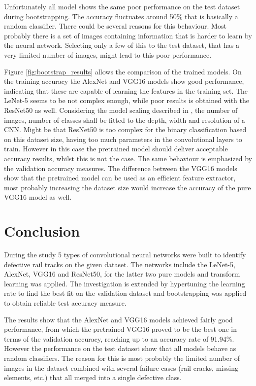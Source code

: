 \documentclass[10pt, final]{article}
\begin{document}
Unfortunately all model shows the same poor performance on the test dataset during bootstrapping.
The accuracy fluctuates around 50\% that is basically a random classifier.
There could be several reasons for this behaviour.
Most probably there is a set of images containing information that is harder to learn by the neural network.
Selecting only a few of this to the test dataset, that has a very limited number of images, might lead to this
poor performance.

Figure \ref{fig:bootstrap_results} allows the comparison of the trained models.
On the training accuracy the AlexNet and VGG16 models show good performance, indicating that these are capable
of learning the features in the training set.
The LeNet-5 seems to be not complex enough, while poor results is obtained with the ResNet50 as well.
Considering the model scaling described in \cite{tan_efficientnet_2020}, the number of images, number of classes
shall be fitted to the depth, width and resolution of a CNN.
Might be that ResNet50 is too complex for the binary classification based on this dataset size, having too much
parameters in the convolutional layers to train.
However in this case the pretrained model should deliver acceptable accuracy results, whilst this is not the case.
The same behaviour is emphasized by the validation accuracy measures.
The difference between the VGG16 models show that the pretrained model can be used as an efficient feature extractor,
most probably increasing the dataset size would increase the accuracy of the pure VGG16 model as well.

\section{Conclusion} \label{sec:conclusion}
During the study 5 types of convolutional neural networks were built to identify defective rail tracks on the given dataset.
The networks include the LeNet-5, AlexNet, VGG16 and ResNet50, for the latter two pure models and transform learning was applied.
The investigation is extended by hypertuning the learning rate to find the best fit on the validation dataset and bootstrapping
was applied to obtain reliable test accuracy measure.

The results show that the AlexNet and VGG16 models achieved fairly good performance, from which the pretrained VGG16 proved to
be the best one in terms of the validation accuracy, reaching up to an accuracy rate of 91.94\%.
However the performance on the test dataset show that all models behave as random classifiers.
The reason for this is most probably the limited number of images in the dataset combined with several failure cases
(rail cracks, missing elements, etc.) that all merged into a single defective class.
\end{document}
